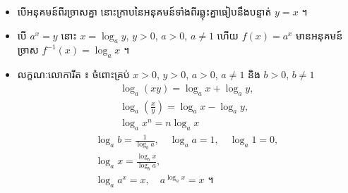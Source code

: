 \begin{note}[មេរៀនសង្ខេប]
\begin{enumerate}[1]
\begin{itemize}
    \item បើអនុគមន៍ពីរច្រាសគ្នា នោះក្រាបនៃអនុគមន៍ទាំងពីរឆ្លុះគ្នាធៀបនឹងបន្ទាត់ $y = x$ ។
    \item បើ $a^x = y$ នោះ $x = \log_a y$, $y > 0$, $a > 0$, $a \ne 1$ ហើយ $f(x) = a^x$ មានអនុគមន៍ច្រាស $f^{-1}(x) = \log_a x$ ។
    \item លក្ខណៈលោការីត ៖ ចំពោះគ្រប់ $x > 0$, $y > 0$, $a > 0$, $a \ne 1$ និង $b > 0$, $b \ne 1$
    \[
\begin{gathered}
\log_a(xy) = \log_a x + \log_a y,\\
\log_a\left(\frac{x}{y}\right) = \log_a x - \log_a y,\\
\log_a x^n = n\log_a x
\end{gathered}
\]
    \[
\begin{gathered}
\log_a b = \frac{1}{\log_b a}, \quad \log_a a = 1, \quad \log_a 1 = 0,\\
\log_a x = \frac{\log_b x}{\log_b a},\\
\log_a a^x = x, \quad a^{\log_a x} = x \text{ ។}
\end{gathered}
\]
  \end{itemize}
\end{enumerate}
\end{note}

